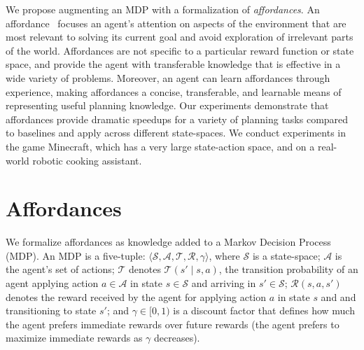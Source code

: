 \documentclass[conference]{IEEEtran}
\begin{document}
We propose augmenting an MDP with a formalization of 
{\em affordances}. An affordance~\cite{gibson77} focuses an
agent's attention on aspects of the environment that are
most relevant to solving its current goal and avoid exploration of
irrelevant parts of the world. Affordances are not specific to a particular
reward function or state space, and provide the agent with transferable 
knowledge that is effective in a wide variety of problems. Moreover, an 
agent can learn affordances through experience, making affordances a 
concise, transferable, and learnable means of representing useful planning
knowledge.  Our experiments demonstrate that affordances provide dramatic
speedups for a variety of planning tasks compared to baselines and apply across
different state-spaces.  We conduct experiments in the game Minecraft, which has
a very large state-action space, and on a real-world robotic cooking assistant.


\section{Affordances}
\label{sec:affordances}

We formalize affordances as knowledge added to a Markov Decision Process
(MDP).  An MDP is a five-tuple: $\langle \mathcal{S}, \mathcal{A},
\mathcal{T}, \mathcal{R}, \gamma \rangle$, where $\mathcal{S}$ is a
state-space; $\mathcal{A}$ is the agent's set of actions;
$\mathcal{T}$ denotes $\mathcal{T}(s' \mid s,a)$, the transition
probability of an agent applying action $a \in \mathcal{A}$ in state
$s \in \mathcal{S}$ and arriving in $s' \in \mathcal{S}$;
$\mathcal{R}(s,a,s')$ denotes the reward received by the agent for
applying action $a$ in state $s$ and and transitioning to state $s'$;
and $\gamma \in [0, 1)$ is a discount factor that defines how much the
agent prefers immediate rewards over future rewards (the agent
prefers to maximize immediate rewards as $\gamma$ decreases).

\end{document}

